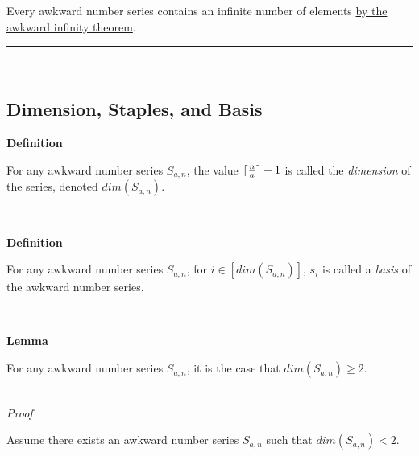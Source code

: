 \documentclass[a4paper,12pt]{article}
\DeclarePairedDelimiter{\ceil}{\lceil}{\rceil}
\begin{document}
\noindent Every awkward number series contains an infinite number of elements \hyperlink{theorem:infinite_asn}{by the awkward infinity theorem}.

\begin{center}
\noindent\rule{8cm}{0.4pt}
\end{center}
\noindent \\








\subsection{Dimension, Staples, and Basis}




\label{definition:dimension}
\hypertarget{definition:dimension}{}
\begin{tcolorbox}
\textbf{Definition}

For any awkward number series $S_{a,n}$, the value $\ceil{\frac{n}{a}} + 1$ is called the \textit{dimension} of the series, denoted $dim(S_{a, n})$.

\end{tcolorbox}
\noindent \\







\label{definition:basis}
\hypertarget{definition:basis}{}
\begin{tcolorbox}
\textbf{Definition}

For any awkward number series $S_{a,n}$, for $i \in [dim(S_{a,n})]$, $s_i$ is called a \textit{basis} of the awkward number series.

\end{tcolorbox}
\noindent \\






\label{lemma:min_dimension}
\hypertarget{lemma:min_dimension}{}
\begin{tcolorbox}
\textbf{Lemma}

For any awkward number series $S_{a, n}$, it is the case that $dim(S_{a, n}) \geq 2$.

\end{tcolorbox}

\noindent \\
\textit{Proof}

\noindent Assume there exists an awkward number series $S_{a, n}$ such that $dim(S_{a, n}) < 2$.\\
\end{document}
